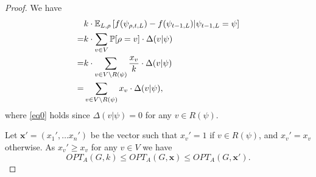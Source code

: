 \begin{proof}
We have 
\begin{align}
&k\cdot \mathbb{E}_{L,\rho}\left[f({\psi}_{\rho,t,L})-f(\psi_{t-1,L})|\psi_{t-1,L}=\psi \right]\nonumber\\
=&k\cdot \sum_{v\in V}\mathbb{P}[\rho=v]\cdot \Delta(v|\psi)\nonumber\\
=&k\cdot \sum_{v\in V\setminus R(\psi)}\frac{x_v}{k}\cdot \Delta(v|\psi)\label{eq0}\\
=&\sum_{v\in V\setminus R(\psi)}x_v\cdot \Delta(v|\psi),\label{eq1}
\end{align}
where \eqref{eq0} holds since $\Delta(v|\psi)=0$ for any $v\in R(\psi)$. 

Let $\bm x'=(x_1',\ldots x_n')$ be the vector such that $x_v'=1$ if $v\in R(\psi)$, and $x_v'=x_v$ otherwise. As $x_v'\geq x_v$ for any $v\in V$ we have  
\begin{equation}\label{eq2}
OPT_A(G,k)\leq OPT_A(G,\bm x)\leq OPT_A(G,\bm x').
\end{equation}


\end{proof}
